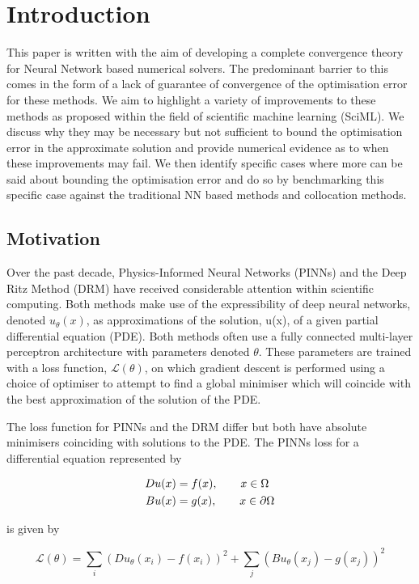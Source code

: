 \documentclass[11pt, onecolumn]{report}
\begin{document}
\section{Introduction}
This paper is written with the aim of developing a complete convergence theory for Neural Network based numerical solvers. The predominant barrier to this comes in the form of a lack of guarantee of convergence of the optimisation error for these methods. We aim to highlight a variety of improvements to these methods as proposed within the field of scientific machine learning (SciML). We discuss why they may be necessary but not sufficient to bound the optimisation error in the approximate solution and provide numerical evidence as to when these improvements may fail. We then identify specific cases where more can be said about bounding the optimisation error and do so by benchmarking this specific case against the traditional NN based methods and collocation methods.

\subsection{Motivation}

Over the past decade, Physics-Informed Neural Networks (PINNs) \cite{Raissi_PINNs} and the Deep Ritz Method (DRM) \cite{E_DRM} have received considerable attention within scientific computing. Both methods make use of the expressibility of deep neural networks, denoted $u_\theta(x)$, as approximations of the solution, u(x), of a given partial differential equation (PDE).
Both methods often use a fully connected multi-layer perceptron architecture with parameters denoted $\theta$. These parameters are trained with a loss function, $\mathcal{L}(\theta)$, on which gradient descent is performed using a choice of optimiser to attempt to find a global minimiser which will coincide with the best approximation of the solution of the PDE. 

The loss function for PINNs and the DRM differ but both have absolute minimisers coinciding with solutions to the PDE. The PINNs loss for a differential equation represented by

\begin{align*}
\centering
 Du(x) &= f(x), \qquad x\in \Omega \\
 Bu(x) &= g(x), \qquad x\in \partial\Omega
 \end{align*}

is given by

\begin{equation*}
	\mathcal L(\theta) = \sum_i (Du_\theta(x_i) - f(x_i))^2 + \sum_j (Bu_\theta(x_j)-g(x_j))^2
\end{equation*}
\end{document}
